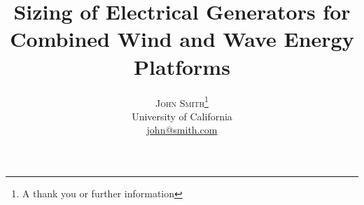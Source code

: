 \documentclass[twoside]{article}
\title{\vspace{-15mm}\fontsize{24pt}{10pt}\selectfont\textbf{Sizing of Electrical Generators for Combined Wind and Wave Energy Platforms}} %
\author{
\large
\textsc{John Smith}\thanks{A thank you or further information}\\[2mm] %
\normalsize University of California \\ %
\normalsize \href{mailto:john@smith.com}{john@smith.com} %
\vspace{-5mm}
}
\date{}
\begin{document}
\maketitle %

\thispagestyle{fancy} %


\begin{abstract}

\noindent \lipsum[1] %

\end{abstract}

\end{document}
